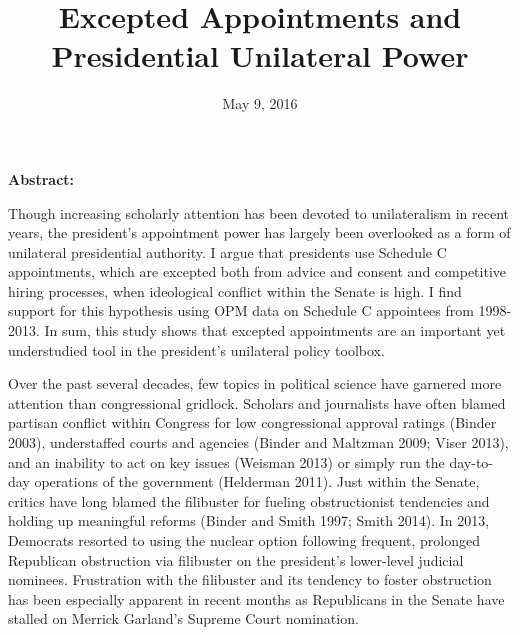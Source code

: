\documentclass[12pt]{article}
\title{\vspace{2.8in}Excepted Appointments and Presidential Unilateral Power}
\date{May 9, 2016}
\begin{document}
%
\maketitle
\parindent=0.5in
\parskip=0.01in
\doublespacing

\newpage
\noindent \textbf{Abstract:}

Though increasing scholarly attention has been devoted to unilateralism in recent years, the president's appointment power has largely been overlooked as a form of unilateral presidential authority. I argue that presidents use Schedule C appointments, which are excepted both from advice and consent and competitive hiring processes, when ideological conflict within the Senate is high. I find support for this hypothesis using OPM data on Schedule C appointees from 1998-2013. In sum, this study shows that excepted appointments are an important yet understudied tool in the president's unilateral policy toolbox. 

\newpage
{}

Over the past several decades, few topics in political science have garnered more attention than congressional gridlock. Scholars and journalists have often blamed partisan conflict within Congress for low congressional approval ratings (Binder 2003), understaffed courts and agencies (Binder and Maltzman 2009; Viser 2013), and an inability to act on key issues (Weisman 2013) or simply run the day-to-day operations of the government (Helderman 2011). Just within the Senate, critics have long blamed the filibuster for fueling obstructionist tendencies and holding up meaningful reforms (Binder and Smith 1997; Smith 2014). In 2013, Democrats resorted to using the nuclear option following frequent, prolonged Republican obstruction via filibuster on the president's lower-level judicial nominees. Frustration with the filibuster and its tendency to foster obstruction has been especially apparent in recent months as Republicans in the Senate have stalled on Merrick Garland's Supreme Court nomination.
\end{document}
